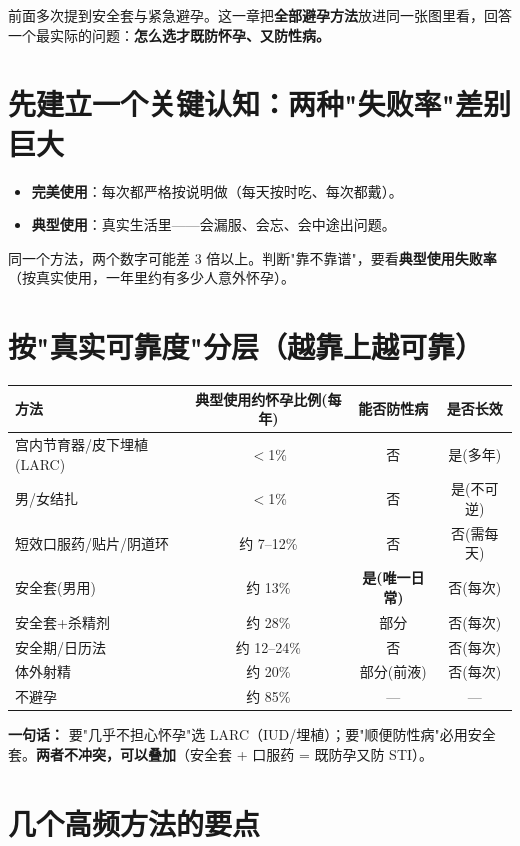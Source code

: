 \documentclass[12pt,UTF8,openany]{ctexbook}
\begin{document}
\label{chap:contraception}

前面多次提到安全套与紧急避孕。这一章把\textbf{全部避孕方法}放进同一张图里看，回答一个最实际的问题：\textbf{怎么选才既防怀孕、又防性病。}

\section{先建立一个关键认知：两种"失败率"差别巨大}

\begin{itemize}[leftmargin=2em,itemsep=0.3em]
  \item \textbf{完美使用}：每次都严格按说明做（每天按时吃、每次都戴）。
  \item \textbf{典型使用}：真实生活里——会漏服、会忘、会中途出问题。
\end{itemize}

\noindent 同一个方法，两个数字可能差 3 倍以上。判断"靠不靠谱"，要看\textbf{典型使用失败率}（按真实使用，一年里约有多少人意外怀孕）。

\section{按"真实可靠度"分层（越靠上越可靠）}

\begin{tabularx}{\textwidth}{p{3.4cm}CCC}
\toprule
方法 & 典型使用约怀孕比例(每年) & 能否防性病 & 是否长效 \\
\midrule
宫内节育器/皮下埋植(LARC) & $<$1\% & 否 & 是(多年) \\
男/女结扎 & $<$1\% & 否 & 是(不可逆) \\
短效口服药/贴片/阴道环 & 约 7--12\% & 否 & 否(需每天) \\
安全套(男用) & 约 13\% & \textbf{是(唯一日常)} & 否(每次) \\
安全套+杀精剂 & 约 28\% & 部分 & 否(每次) \\
安全期/日历法 & 约 12--24\% & 否 & 否(每次) \\
体外射精 & 约 20\% & 部分(前液) & 否(每次) \\
不避孕 & 约 85\% & — & — \\
\bottomrule
\end{tabularx}

\vspace{0.5em}
\noindent\textbf{一句话：} 要"几乎不担心怀孕"选 LARC（IUD/埋植）；要"顺便防性病"必用安全套。\textbf{两者不冲突，可以叠加}（安全套 + 口服药 = 既防孕又防 STI）。

\section{几个高频方法的要点}
\end{document}
